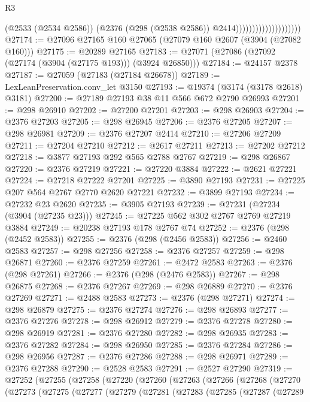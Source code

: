 \begin{lexlean}{R3}
\begin{coremodule}
                                          (@2533 (@2534 @2586))
                                          (@2376 (@298 (@2538 @2586)) @2414))))))))))))))))))))
@27174 := @27096 @27165 @160 @27065 (@27079 @160 @2607 (@3904 (@27082 @160)))
@27175 := @20289 @27165
@27183 := @27071 (@27086 (@27092 (@27174 (@3904 (@27175 @193))) (@3924 @26850)))
@27184 := @24157 @2378
@27187 := @27059 (@27183 (@27184 @26678))
@27189 := LexLeanPreservation.conv_let @3150
@27193 := @19374 (@3174 (@3178 @2618) @3181)
@27200 := @27189 @27193 @38 @11 @566 @672 @2790 @26993
@27201 := @298 @26910
@27202 := @27200 @27201
@27203 := @298 @26903
@27204 := @2376 @27203
@27205 := @298 @26945
@27206 := @2376 @27205
@27207 := @298 @26981
@27209 := @2376 @27207 @2414
@27210 := @27206 @27209
@27211 := @27204 @27210
@27212 := @2617 @27211
@27213 := @27202 @27212
@27218 := @3877 @27193 @292 @565 @2788 @2767
@27219 := @298 @26867
@27220 := @2376 @27219
@27221 := @27220 @3884
@27222 := @2621 @27221
@27224 := @27218 @27222 @27201
@27225 := @3890 @27193
@27231 := @27225 @207 @564 @2767 @2770 @2620 @27221
@27232 := @3899 @27193
@27234 := @27232 @23 @2620
@27235 := @3905 @27193
@27239 := @27231 (@27234 (@3904 (@27235 @23)))
@27245 := @27225 @562 @302 @2767 @2769 @27219 @3884
@27249 := @20238 @27193 @178 @2767 @74
@27252 := @2376 (@298 (@2452 @2583))
@27255 := @2376 (@298 (@2456 @2583))
@27256 := @2460 @2583
@27257 := @298 @27256
@27258 := @2376 @27257
@27259 := @298 @26871
@27260 := @2376 @27259
@27261 := @2472 @2583
@27263 := @2376 (@298 @27261)
@27266 := @2376 (@298 (@2476 @2583))
@27267 := @298 @26875
@27268 := @2376 @27267
@27269 := @298 @26889
@27270 := @2376 @27269
@27271 := @2488 @2583
@27273 := @2376 (@298 @27271)
@27274 := @298 @26879
@27275 := @2376 @27274
@27276 := @298 @26893
@27277 := @2376 @27276
@27278 := @298 @26912
@27279 := @2376 @27278
@27280 := @298 @26919
@27281 := @2376 @27280
@27282 := @298 @26935
@27283 := @2376 @27282
@27284 := @298 @26950
@27285 := @2376 @27284
@27286 := @298 @26956
@27287 := @2376 @27286
@27288 := @298 @26971
@27289 := @2376 @27288
@27290 := @2528 @2583
@27291 := @2527 @27290
@27319 := @27252
    (@27255
      (@27258
        (@27220
          (@27260
            (@27263
              (@27266
                (@27268
                  (@27270
                    (@27273
                      (@27275
                        (@27277
                          (@27279
                            (@27281
                              (@27283
                                (@27285
                                  (@27287
                                    (@27289

\end{coremodule}
\end{lexlean}
